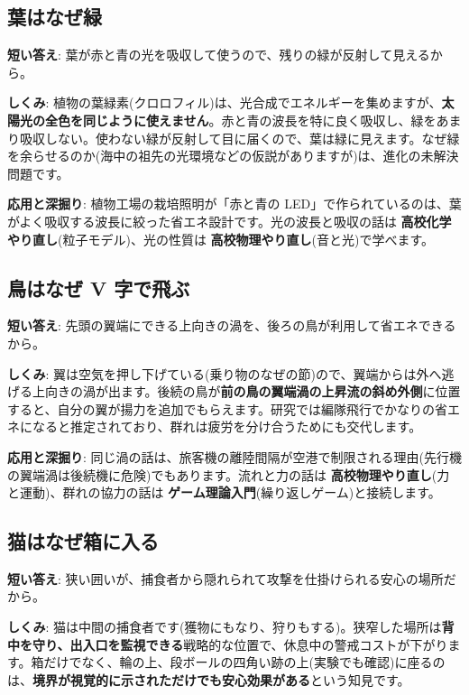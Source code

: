 \documentclass{article}
\begin{document}
\subsection{葉はなぜ緑}

\textbf{短い答え}: 葉が赤と青の光を吸収して使うので、残りの緑が反射して見えるから。

\textbf{しくみ}: 植物の葉緑素(クロロフィル)は、光合成でエネルギーを集めますが、\textbf{太陽光の全色を同じように使えません}。赤と青の波長を特に良く吸収し、緑をあまり吸収しない。使わない緑が反射して目に届くので、葉は緑に見えます。なぜ緑を余らせるのか(海中の祖先の光環境などの仮説がありますが)は、進化の未解決問題です。

\textbf{応用と深掘り}: 植物工場の栽培照明が「赤と青の LED」で作られているのは、葉がよく吸収する波長に絞った省エネ設計です。光の波長と吸収の話は \textbf{高校化学やり直し}(粒子モデル)、光の性質は \textbf{高校物理やり直し}(音と光)で学べます。

\subsection{鳥はなぜ V 字で飛ぶ}

\textbf{短い答え}: 先頭の翼端にできる上向きの渦を、後ろの鳥が利用して省エネできるから。

\textbf{しくみ}: 翼は空気を押し下げている(乗り物のなぜの節)ので、翼端からは外へ逃げる上向きの渦が出ます。後続の鳥が\textbf{前の鳥の翼端渦の上昇流の斜め外側}に位置すると、自分の翼が揚力を追加でもらえます。研究では編隊飛行でかなりの省エネになると推定されており、群れは疲労を分け合うためにも交代します。

\textbf{応用と深掘り}: 同じ渦の話は、旅客機の離陸間隔が空港で制限される理由(先行機の翼端渦は後続機に危険)でもあります。流れと力の話は \textbf{高校物理やり直し}(力と運動)、群れの協力の話は \textbf{ゲーム理論入門}(繰り返しゲーム)と接続します。

\subsection{猫はなぜ箱に入る}

\textbf{短い答え}: 狭い囲いが、捕食者から隠れられて攻撃を仕掛けられる安心の場所だから。

\textbf{しくみ}: 猫は中間の捕食者です(獲物にもなり、狩りもする)。狭窄した場所は\textbf{背中を守り、出入口を監視できる}戦略的な位置で、休息中の警戒コストが下がります。箱だけでなく、輪の上、段ボールの四角い跡の上(実験でも確認)に座るのは、\textbf{境界が視覚的に示されただけでも安心効果がある}という知見です。
\end{document}
